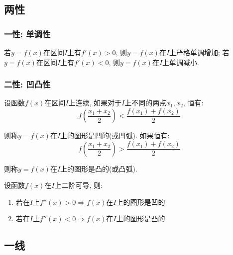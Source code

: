 \subsection{两性}
\subsubsection{一性: 单调性}
若$ y=f(x) $在区间$ I $上有$ f'(x)>0 $, 则$ y=f(x) $在$ I $上严格单调增加; 若$ y=f(x) $在区间$ I $上有$ f'(x)<0 $, 则$ y=f(x) $在$ I $上单调减小.
\subsubsection{二性: 凹凸性}
设函数$ f(x) $在区间$ I $上连续, 如果对于$ I $上不同的两点$ x_{1}, x_{2} $, 恒有:
\begin{equation*}
    f(\frac{x_{1}+x_{2}}{2})<\frac{f(x_{1})+f(x_{2})}{2}
\end{equation*}\par
则称$ y=f(x) $在$ I $上的图形是凹的(或凹弧). 如果恒有:
\begin{equation*}
    f(\frac{x_{1}+x_{2}}{2})>\frac{f(x_{1})+f(x_{2})}{2}
\end{equation*}\par
则称$ y=f(x) $在$ I $上的图形是凸的(或凸弧). \par \vspace{.5em}
 \par \vspace{.5em}
设函数$ f(x) $在$ I $上二阶可导, 则:
\begin{enumerate}
    \item 若在$ I $上$ f''(x)>0\Rightarrow f(x) $在$ I $上的图形是凹的
    \item 若在$ I $上$ f''(x)<0\Rightarrow f(x) $在$ I $上的图形是凸的
\end{enumerate}
\subsection{一线}
